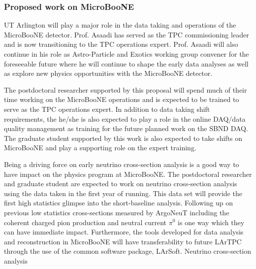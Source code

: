 \subsubsection{Proposed work on MicroBooNE}\label{sec:proposeUboone}
UT Arlington will play a major role in the data taking and operations of the MicroBooNE detector. Prof. Asaadi has served as the TPC commissioning leader and is now transitioning to the TPC operations expert. Prof. Asaadi will also continue in his role as Astro-Particle and Exotics working group convener for the foreseeable future where he will continue to shape the early data analyses as well as explore new physics opportunities with the MicroBooNE detector.

The postdoctoral researcher supported by this proposal will spend much of their time working on the MicroBooNE operations and is expected to be trained to serve as the TPC operations expert. In addition to data taking shift requirements, the he/she is also expected to play a role in the online DAQ/data quality management as training for the future planned work on the SBND DAQ. The graduate student supported by this work is also expected to take shifts on MicroBooNE and play a supporting role on the expert training.

Being a driving force on early neutrino cross-section analysis is a good way to have impact on the physics program at MicroBooNE. The postdoctoral researcher and graduate student are expected to work on neutrino cross-section analysis using the data taken in the first year of running. This data set will provide the first high statistics glimpse into the short-baseline analysis. Following up on previous low statistics cross-sections measured by ArgoNeuT including the coherent charged pion production and neutral current $\pi^{0}$ is one way which they can have immediate impact. Furthermore, the tools developed for data analysis and reconstruction in MicroBooNE will have transferability to future LArTPC through the use of the common software package, LArSoft.
Neutrino cross-section analysis
